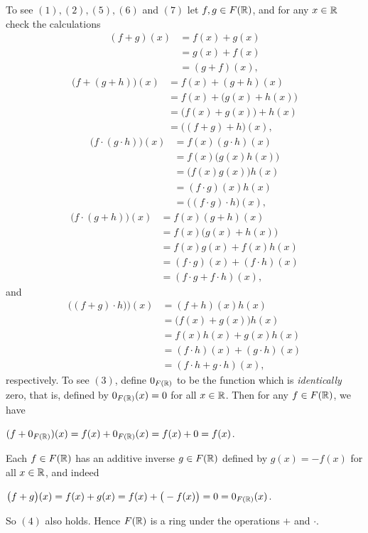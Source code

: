 \documentclass[11pt,fleqn,dvipsnames,usenames]{article}
\begin{document}
\begin{enumerate}[1.]
\begin{enumerate}[(a)]
To see $(1), (2), (5), (6)$ and $(7)$ let $f,g\in F(\mathbb{R})$, and for any $x\in \mathbb{R}$ check the calculations
\begin{align*}
(f+g)(x) &= f(x) + g(x)\\
&= g(x) +  f(x)\\
&= (g+f)(x),
\end{align*}
\begin{align*}
\big(f + (g + h)\big)(x) &= f(x) + (g+h)(x)\\
&= f(x) + \big(g(x) + h(x)\big)\\
&= \big(f(x) + g(x)\big) + h(x)\\
&= \big((f+g) + h\big)(x),
\end{align*}
\begin{align*}
\big(f\cdot(g\cdot h)\big)(x) &= f(x)(g\cdot h)(x)\\
&= f(x)\big(g(x)h(x)\big)\\
&= \big(f(x)g(x)\big)h(x)\\
&= (f\cdot g)(x)h(x)\\
&= \big((f\cdot g)\cdot h\big)(x),
\end{align*}
\begin{align*}
\big(f\cdot (g+h)\big)(x) &= f(x)(g+h)(x)\\
&= f(x)\big(g(x) + h(x)\big)\\
&= f(x)g(x) + f(x)h(x)\\
&= (f\cdot g)(x) + (f\cdot h)(x)\\
&= (f\cdot g + f\cdot h)(x),
\end{align*}
and
\begin{align*}
\big((f +g)\cdot h)\big)(x) &= (f+h)(x)h(x)\\
&= \big(f(x)+g(x)\big)h(x)\\
&= f(x)h(x) + g(x)h(x)\\
&= (f\cdot h)(x) + (g\cdot h)(x)\\
&= (f\cdot h + g\cdot h)(x),
\end{align*}
respectively.  To see $(3)$, define $0_{F(\mathbb{R})}$ to be the function which is \emph{identically} zero, that is, defined by $0_{F(\mathbb{R})}(x) = 0$ for all $x\in \mathbb{R}$.  Then for any $f\in F(\mathbb{R})$, we have
\begin{center}
$(f + 0_{F(\mathbb{R})})(x) = f(x) + 0_{F(\mathbb{R})}(x) = f(x) + 0 = f(x)$.
\end{center}

Each $f\in F(\mathbb{R})$ has an additive inverse $g\in F(\mathbb{R})$ defined by $g(x) = -f(x)$ for all $x\in \mathbb{R}$, and indeed
\begin{center}
$\big(f + g\big)(x) = f(x) + g(x) = f(x) + \big(-f(x)\big) = 0 = 0_{F(\mathbb{R})}(x)$.
\end{center}
So $(4)$ also holds.  Hence $F(\mathbb{R})$ is a ring under the operations $+$ and $\cdot$.
\end{enumerate}


\end{enumerate}
\end{document}
